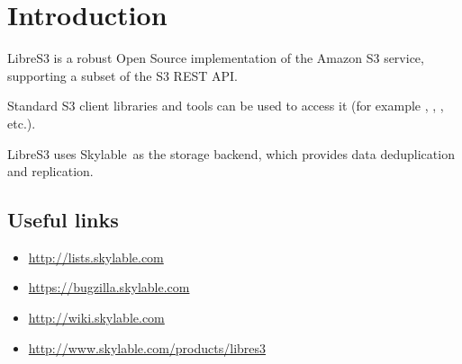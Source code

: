 \chapter{Introduction}
\indent LibreS3 is a robust Open Source implementation of the Amazon S3 service,
supporting a subset of the S3 REST API\@.

Standard S3 client libraries and tools can be used to access it (for example , , , etc.).

LibreS3 uses Skylable~\SX as the storage backend, which provides data
deduplication and replication.

\section{Useful links}
\begin{itemize}
    \item \url{http://lists.skylable.com}
    \item \url{https://bugzilla.skylable.com}
    \item \url{http://wiki.skylable.com}
    \item \url{http://www.skylable.com/products/libres3}
\end{itemize}
